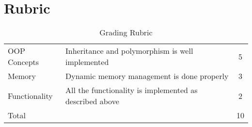 \documentclass[a4paper,12pt]{article}
\begin{document}
\section{Rubric}
\begin{table}[!h]
	\centering
	\begin{tabular}{llc}
		\toprule
		OOP Concepts & Inheritance and polymorphism is well implemented & 5 \\
		 Memory &	Dynamic memory management is done properly	& 3\\
		Functionality	& All the functionality is implemented as described above	& 2 \\
		\midrule
		Total & & 10\\
		\bottomrule
	\end{tabular}
	\caption{Grading Rubric}
	\label{Grading}
\end{table}


	
	
\end{document}
